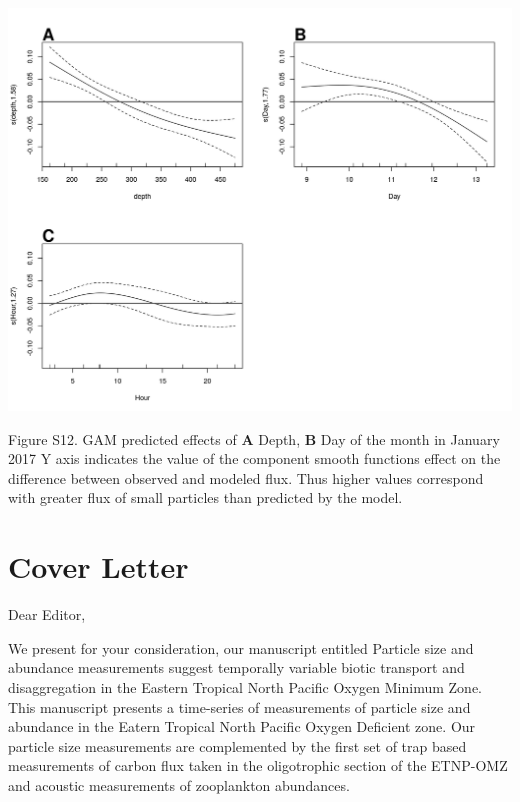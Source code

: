 \documentclass[]{article}
\begin{document}
\includegraphics{../figures/OSMSGamPlot.png}

Figure S12. GAM predicted effects of \textbf{A} Depth, \textbf{B} Day of
the month in January 2017 Y axis indicates the value of the component
smooth functions effect on the difference between observed and modeled
flux. Thus higher values correspond with greater flux of small particles
than predicted by the model.

\hypertarget{cover-letter}{%
\section{Cover Letter}\label{cover-letter}}

Dear Editor,

We present for your consideration, our manuscript entitled Particle size
and abundance measurements suggest temporally variable biotic transport
and disaggregation in the Eastern Tropical North Pacific Oxygen Minimum
Zone. This manuscript presents a time-series of measurements of particle
size and abundance in the Eatern Tropical North Pacific Oxygen Deficient
zone. Our particle size measurements are complemented by the first set
of trap based measurements of carbon flux taken in the oligotrophic
section of the ETNP-OMZ and acoustic measurements of zooplankton
abundances.
\end{document}
